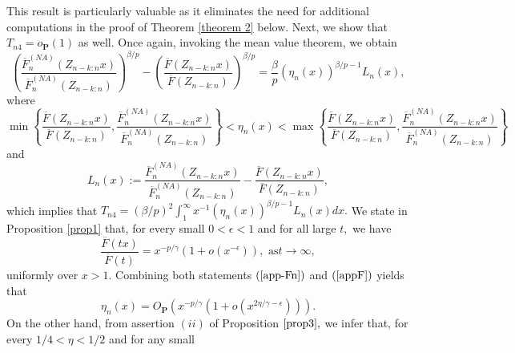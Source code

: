 \documentclass[reqno,openbib,runningheads,a4paper,12pt]{amsart}%
\begin{document}
This result is particularly valuable as it eliminates the need for additional
computations in the proof of Theorem \ref{theorem 2} below. Next, we show that
$T_{n4}=o_{\mathbf{P}}\left(  1\right)  $ as well. Once again, invoking the
mean value theorem, we obtain%
\[
\left(  \frac{\overline{F}_{n}^{\left(  NA\right)  }\left(  Z_{n-k:n}x\right)
}{\overline{F}_{n}^{\left(  NA\right)  }\left(  Z_{n-k:n}\right)  }\right)
^{\beta/p}-\left(  \frac{\overline{F}\left(  Z_{n-k:n}x\right)  }{\overline
{F}\left(  Z_{n-k:n}\right)  }\right)  ^{\beta/p}=\frac{\beta}{p}\left(
\eta_{n}\left(  x\right)  \right)  ^{\beta/p-1}L_{n}\left(  x\right)  ,
\]
where%
\[
\min\left\{  \frac{\overline{F}\left(  Z_{n-k:n}x\right)  }{\overline
{F}\left(  Z_{n-k:n}\right)  },\frac{\overline{F}_{n}^{\left(  NA\right)
}\left(  Z_{n-k:n}x\right)  }{\overline{F}_{n}^{\left(  NA\right)  }\left(
Z_{n-k:n}\right)  }\right\}  <\eta_{n}\left(  x\right)  <\max\left\{
\frac{\overline{F}\left(  Z_{n-k:n}x\right)  }{\overline{F}\left(
Z_{n-k:n}\right)  },\frac{\overline{F}_{n}^{\left(  NA\right)  }\left(
Z_{n-k:n}x\right)  }{\overline{F}_{n}^{\left(  NA\right)  }\left(
Z_{n-k:n}\right)  }\right\}
\]
and
\begin{equation}
L_{n}\left(  x\right)  :=\frac{\overline{F}_{n}^{\left(  NA\right)  }\left(
Z_{n-k:n}x\right)  }{\overline{F}_{n}^{\left(  NA\right)  }\left(
Z_{n-k:n}\right)  }-\frac{\overline{F}\left(  Z_{n-k:n}x\right)  }%
{\overline{F}\left(  Z_{n-k:n}\right)  }, \label{Ln}%
\end{equation}
which implies that $T_{n4}=\left(  \beta/p\right)  ^{2}\int_{1}^{\infty}%
x^{-1}\left(  \eta_{n}\left(  x\right)  \right)  ^{\beta/p-1}L_{n}\left(
x\right)  dx.$ We state in Proposition \ref{prop1} that, for every small
$0<\epsilon<1$ and for all large $t,$ we have%
\begin{equation}
\frac{\overline{F}\left(  tx\right)  }{\overline{F}\left(  t\right)
}=x^{-p/\gamma}\left(  1+o\left(  x^{-\epsilon}\right)  \right)  ,\text{ as
}t\rightarrow\infty, \label{appF}%
\end{equation}
uniformly over $x>1.$ Combining both statements $\left(  \ref{app-Fn}\right)
$ and $\left(  \ref{appF}\right)  $ yields that%
\begin{equation}
\eta_{n}\left(  x\right)  =O_{\mathbf{P}}\left(  x^{-p/\gamma}\left(
1+o\left(  x^{2\eta/\gamma-\epsilon}\right)  \right)  \right)  .
\label{appeta}%
\end{equation}
On the other hand, from assertion $\left(  ii\right)  $ of Proposition
$\ref{prop3},$ we infer that, for every $1/4<\eta<1/2$ and for any small
\end{document}
